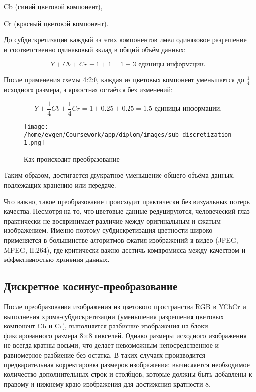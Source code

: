 Cb (синий цветовой компонент),

Cr (красный цветовой компонент).

До субдискретизации каждый из этих компонентов имел одинаковое разрешение и соответственно одинаковый вклад в общий объём данных:


\begin{equation}
    Y + Cb + Cr = 1+1+1=3 \text{ единицы информации}.
\end{equation}

После применения схемы 4:2:0, каждая из цветовых компонент уменьшается до $\frac{1}{4}$ исходного размера, а яркостная остаётся без изменений:

\begin{equation}
    Y + \frac{1}{4}Cb + \frac{1}{4}Cr = 1 + 0.25 + 0.25 = 1.5 \text{ единицы информации}.
\end{equation}

\begin{figure}[H]
    \centering
    \texttt{[image: /home/evgen/Coursework/app/diplom/images/sub\_discretization1.png]}
    \caption{Как происходит преобразование}
    \label{fig:sub_dis}
\end{figure}

Таким образом, достигается двукратное уменьшение общего объёма данных, подлежащих хранению или передаче.

Что важно, такое преобразование происходит практически без визуальных потерь качества. 
Несмотря на то, что цветовые данные редуцируются, человеческий глаз практически не воспринимает различие между оригинальным и сжатым изображением. 
Именно поэтому субдискретизация цветности широко применяется в большинстве алгоритмов сжатия изображений и видео (JPEG, MPEG, H.264),
где критически важно достичь компромисса между качеством и эффективностью хранения данных.

\subsection{Дискретное косинус-преобразование}

После преобразования изображения из цветового пространства RGB в YCbCr и выполнения хрома-субдискретизации (уменьшения разрешения цветовых компонент Cb и Cr), 
выполняется разбиение изображения на блоки фиксированного размера 8×8 пикселей. 
Однако размеры исходного изображения не всегда кратны восьми, что делает невозможным непосредственное и равномерное разбиение без остатка. 
В таких случаях производится предварительная корректировка размеров изображения: вычисляется необходимое количество дополнительных строк и столбцов, 
которые должны быть добавлены к правому и нижнему краю изображения для достижения кратности 8.


